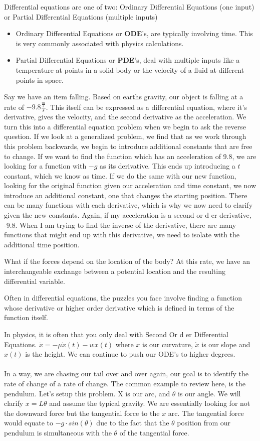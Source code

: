 \documentclass[10pt, oneside]{report}
\begin{document}
Differential equations are one of two:
Ordinary Differential Equations (one input) or Partial Differential Equations (multiple inputs)
\begin{itemize}
    \item Ordinary Differential Equations or \textbf{ODE}'s, are typically involving time.  This is very commonly associated with physics calculations.  
    \item Partial Differential Equations or \textbf{PDE}'s, deal with multiple inputs like a temperature at points in a solid body or the velocity of a fluid at different points in space. 
\end{itemize}
Say we have an item falling.  Based on earths gravity, our object is falling at a rate of $-9.8 \frac{\frac{m}{s}}{s}$.  This itself can be expressed as a differential equation, where it's derivative, gives the velocity, and the second derivative as the acceleration.  
We turn this into a differential equation problem when we begin to ask the reverse question.  If we look at a generalized problem, we find that as we work through this problem backwards, we begin to introduce additional constants that are free to change.  If we want to find the function which has an acceleration of 9.8, we are looking for a function with $-g$ as its derivative.  This ends up introducing a $t$ constant, which we know as time.  If we do the same with our new function, looking for the original function given our acceleration and time constant, we now introduce an additional constant, one that changes the starting position. 
There can be many functions with each derivative, which is why we now need to clarify given the new constants.  
Again, if my acceleration is a second or d er derivative, -9.8.  When I am trying to find the inverse of the derivative, there are many functions that might end up with this derivative, we need to isolate with the additional time position. 

What if the forces depend on the location of the body? At this rate, we have an interchangeable exchange between a potential location and the resulting differential variable.  

Often in differential equations, the puzzles you face involve finding a function whose derivative or higher order derivative which is defined in terms of the function itself. 

In physics, it is often that you only deal with Second Or d er Differential Equations. $\ddot{x} = -\mu\dot{x}(t) - wx(t)$ where $\ddot{x}$ is our curvature, $\dot{x}$ is our slope and $x(t)$ is the height. We can continue to push our ODE's to higher degrees. 
\\
\\
In a way, we are chasing our tail over and over again, our goal is to identify the rate of change of a rate of change.  The common example to review here, is the pendulum.  Let's setup this problem.  X is our arc, and $\theta$ is our angle.  We will clarify $x = L\theta$ and assume the typical gravity.  We are essentially looking for not the downward force but the tangential force to the $x$ arc. The tangential force would equate to $-g\cdot sin(\theta)$ due to the fact that the $\theta$ position from our pendulum is simultaneous with the $\theta$ of the tangential force.
\end{document}
